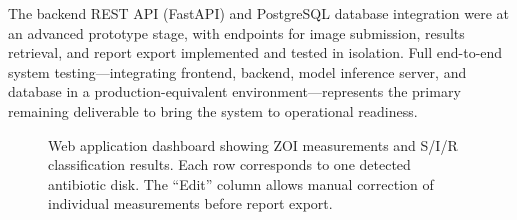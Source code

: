 The backend REST API (FastAPI) and PostgreSQL database integration were at an advanced prototype stage,
with endpoints for image submission, results retrieval, and report export implemented and tested
in isolation.
Full end-to-end system testing---integrating frontend, backend, model inference server,
and database in a production-equivalent environment---represents
the primary remaining deliverable to bring the system to operational readiness.

\begin{figure}[H]
  \centering
  \caption{Web application dashboard showing ZOI measurements and S/I/R classification results.
           Each row corresponds to one detected antibiotic disk.
           The ``Edit'' column allows manual correction of individual measurements before report export.}
  \label{fig:webapp}
\end{figure}
